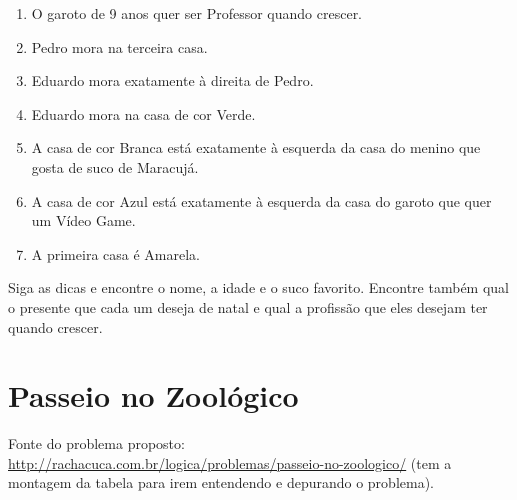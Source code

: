 \documentclass[a4paper,12pt]{article}
\begin{document}
{\begin{enumerate}
\item	O garoto de 9 anos quer ser Professor quando crescer.
\item	Pedro mora na terceira casa.
\item	Eduardo mora exatamente à direita de Pedro.
\item	Eduardo mora na casa de cor Verde.
\item	A casa de cor Branca está exatamente à esquerda da casa do menino que gosta de suco de Maracujá.
\item	A casa de cor Azul está exatamente à esquerda da casa do garoto que quer um Vídeo Game.
\item	A primeira casa é Amarela.
   
\end{enumerate}

Siga as dicas e encontre o nome, a idade e o suco favorito. Encontre também qual o presente que cada um deseja de natal e qual a profissão que eles desejam ter quando crescer.

\newpage
\section{Passeio no Zoológico}

 Fonte do problema proposto:\\
 \url{http://rachacuca.com.br/logica/problemas/passeio-no-zoologico/}
 (tem a montagem da tabela para irem entendendo e depurando o problema).\\

}
\end{document}
